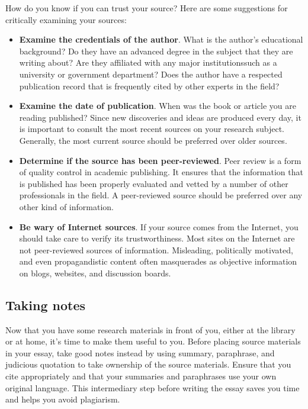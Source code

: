 {How do you know if you can trust your source? Here are some suggestions for 
critically examining your sources:

\begin{itemize}
\item \textbf{Examine the credentials of the author}. What is the author's educational 
background? Do they have an advanced degree in the subject that they are 
writing about? Are they affiliated with any major institutions\textemdash such 
as a university or government department? Does the author have a respected 
publication record that is frequently cited by other experts in the field?

\item \textbf{Examine the date of publication}. When was the book or article 
you are reading published? Since new discoveries and ideas are produced every 
day, it is important to consult the most recent sources on your research 
subject. Generally, the most current source should be preferred over older 
sources.

\item \textbf{Determine if the source has been peer-reviewed}. Peer review is a 
form of quality control in academic publishing. It ensures that the information 
that is published has been properly evaluated and vetted by a number of other 
professionals in the field. A peer-reviewed source should be preferred over any 
other kind of information.

\item \textbf{Be wary of Internet sources}. If your source comes from the 
Internet, you should take care to verify its trustworthiness. Most sites on the 
Internet are not peer-reviewed sources of information. Misleading, politically 
motivated, and even propagandistic content often masquerades as objective 
information on blogs, websites, and discussion boards. 
\end{itemize}

\subsection{Taking notes}

Now that you have some research materials in front of you, either at the 
library or at home, it's time to make them useful to you. Before placing source 
materials in your essay, take good notes instead by using summary, paraphrase, 
and judicious quotation to take ownership of the source materials. Ensure that 
you cite appropriately and that your summaries and paraphrases use your own 
original language. This intermediary step before writing the essay saves you 
time and helps you avoid plagiarism.

}
